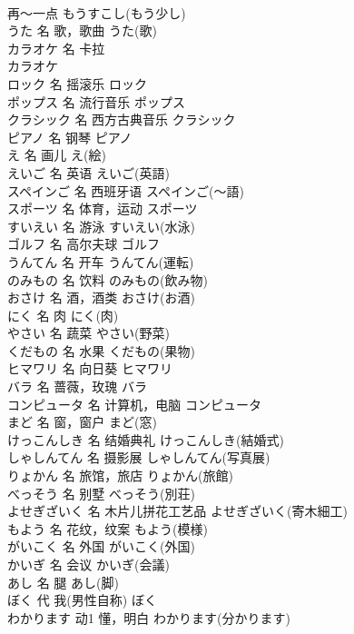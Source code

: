 \documentclass[8pt]{extreport}
\begin{document}
\begin{CJK}{UTF8}{min}
\\	再～一点	もうすこし(もう少し)	
\\	うた	名	歌，歌曲	うた(歌)	
\\	カラオケ	名	卡拉
\\	カラオケ	
\\	ロック	名	摇滚乐	ロック	
\\	ポップス	名	流行音乐	ポップス	
\\	クラシック	名	西方古典音乐	クラシック	
\\	ピアノ	名	钢琴	ピアノ	
\\	え	名	画儿	え(絵)	
\\	えいご	名	英语	えいご(英語)	
\\	スペインご	名	西班牙语	スペインご(～語)	
\\	スポーツ	名	体育，运动	スポーツ	
\\	すいえい	名	游泳	すいえい(水泳)	
\\	ゴルフ	名	高尔夫球	ゴルフ	
\\	うんてん	名	开车	うんてん(運転)	
\\	のみもの	名	饮料	のみもの(飲み物)	
\\	おさけ	名	酒，酒类	おさけ(お酒)	
\\	にく	名	肉	にく(肉)	
\\	やさい	名	蔬菜	やさい(野菜)	
\\	くだもの	名	水果	くだもの(果物)	
\\	ヒマワリ	名	向日葵	ヒマワリ	
\\	バラ	名	蔷薇，玫瑰	バラ	
\\	コンピュータ	名	计算机，电脑	コンピュータ	
\\	まど	名	窗，窗户	まど(窓)	
\\	けっこんしき	名	结婚典礼	けっこんしき(結婚式)	
\\	しゃしんてん	名	摄影展	しゃしんてん(写真展)	
\\	りょかん	名	旅馆，旅店	りょかん(旅館)	
\\	べっそう	名	别墅	べっそう(別荘)	
\\	よせぎざいく	名	木片儿拼花工艺品	よせぎざいく(寄木細工)	
\\	もよう	名	花纹，纹案	もよう(模様)	
\\	がいこく	名	外国	がいこく(外国)	
\\	かいぎ	名	会议	かいぎ(会議)	
\\	あし	名	腿	あし(脚)	
\\	ぼく	代	我(男性自称)	ぼく	
\\	わかります	动1	懂，明白	わかります(分かります)	

\end{CJK}
\end{document}
